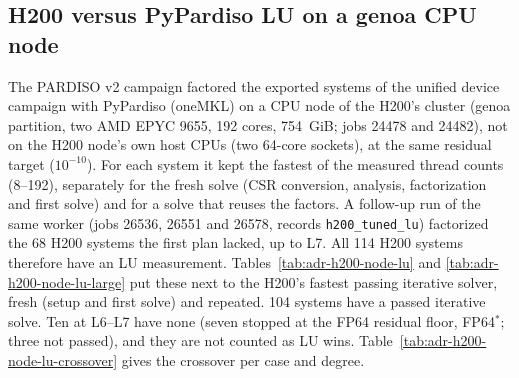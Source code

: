 \begin{table}[ht]
\centering\scriptsize

\caption{Fastest passing family per system for the repeated solve (ms), and the study's
P-LU reused solve. ``BW'': Blackwell.}
\label{tab:adr-h200-family}
\end{table}

\subsection{H200 versus PyPardiso LU on a genoa CPU node}
\label{sec:adr-h200-node-lu}

The PARDISO v2 campaign factored the exported systems of the unified device campaign with
PyPardiso (oneMKL) on a CPU node of the H200's cluster (genoa partition, two AMD EPYC 9655, 192
cores, 754~GiB; jobs 24478 and 24482), not on the H200 node's own host CPUs (two 64-core
sockets), at the same residual target ($10^{-10}$). For each system it kept the fastest of the
measured thread counts (8--192), separately for the fresh solve (CSR conversion, analysis, factorization and first
solve) and for a solve that reuses the factors. A follow-up run of the same worker (jobs 26536,
26551 and 26578, records \texttt{h200\_tuned\_lu}) factorized the 68 H200 systems the first plan
lacked, up to L7. All 114 H200 systems therefore have an LU measurement.
Tables~\ref{tab:adr-h200-node-lu} and \ref{tab:adr-h200-node-lu-large} put these next to the
H200's fastest passing iterative solver, fresh (setup and first solve) and repeated. 104 systems
have a passed iterative solve. Ten at L6--L7 have none (seven stopped at the FP64 residual
floor, FP64$^*$; three not passed), and they are not counted as LU wins. Table~\ref{tab:adr-h200-node-lu-crossover}
gives the crossover per case and degree.
